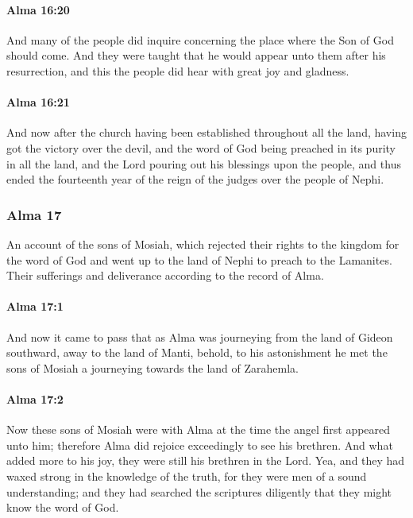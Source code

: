		\paragraph{Alma 16:20} %
			\label{ALMA-16-20}

			And many of the people did inquire
			concerning the place where the Son of God should come.
			And they were taught that he would appear unto them after his resurrection,
			and this the people did hear with great joy and gladness.

		\paragraph{Alma 16:21} %
			\label{ALMA-16-21}

			And now after the church having been established throughout all the land,
			having got the victory over the devil,
			and the word of God being preached in its purity in all the land,
			and the Lord pouring out his blessings upon the people,
			and thus ended the fourteenth year
			of the reign of the judges over the people of Nephi.

	\subsubsection{Alma 17} %
		\label{ALMA-17}
		
		An account of the sons of Mosiah,
		which rejected their rights to the kingdom for the word of God
		and went up to the land of Nephi to preach to the Lamanites.
		Their sufferings and deliverance according to the record of Alma.
		
		\paragraph{Alma 17:1} %
			\label{ALMA-17-1}

			And now it came to pass that as Alma was journeying
			from the land of Gideon southward, away to the land of Manti,
			behold, to his astonishment he met the sons of Mosiah
			a journeying towards the land of Zarahemla.

		\paragraph{Alma 17:2} %
			\label{ALMA-17-2}

			Now these sons of Mosiah were with Alma
			at the time the angel first appeared unto him;
			therefore Alma did rejoice exceedingly to see his brethren.
			And what added more to his joy,
			they were still his brethren in the Lord.
			Yea, and they had waxed strong in the knowledge of the truth,
			for they were men of a sound understanding;
			and they had searched the scriptures diligently
			that they might know the word of God.

